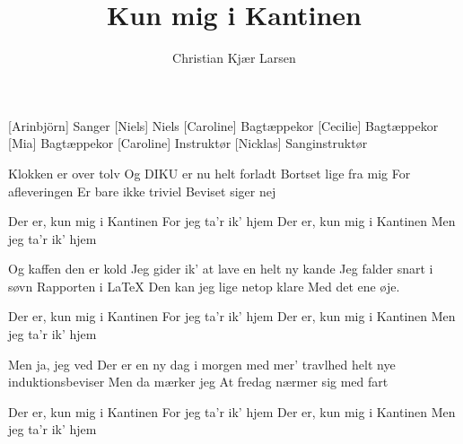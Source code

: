 \documentclass[a4paper,11pt]{article}
\title{Kun mig i Kantinen}
\author{Christian Kjær Larsen}
\begin{document}
\maketitle

\begin{roles}
[Arinbjörn] Sanger
[Niels] Niels
[Caroline] Bagtæppekor
[Cecilie] Bagtæppekor
[Mia] Bagtæppekor
[Caroline] Instruktør
[Nicklas] Sanginstruktør
\end{roles}

\begin{song}
%
Klokken er over tolv
Og DIKU er nu helt forladt
Bortset lige fra mig
For afleveringen
Er bare ikke triviel
Beviset siger nej

Der er, kun mig i Kantinen
For jeg ta'r ik' hjem
Der er, kun mig i Kantinen
Men jeg ta'r ik' hjem

Og kaffen den er kold
Jeg gider ik' at lave en helt ny kande
Jeg falder snart i søvn
Rapporten i LaTeX
Den kan jeg lige netop klare
Med det ene øje.

Der er, kun mig i Kantinen
For jeg ta'r ik' hjem
Der er, kun mig i Kantinen
Men jeg ta'r ik' hjem

Men ja, jeg ved
Der er en ny dag i morgen
med mer' travlhed
helt nye induktionsbeviser
Men da mærker jeg
At fredag nærmer sig med fart


Der er, kun mig i Kantinen
For jeg ta'r ik' hjem
Der er, kun mig i Kantinen
Men jeg ta'r ik' hjem
\end{song}
\end{document}
